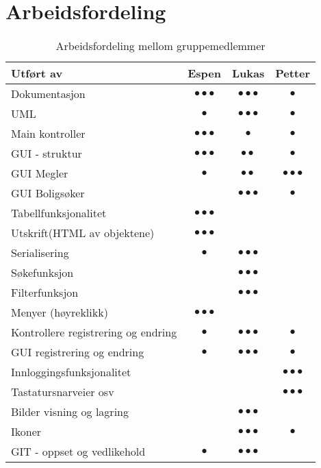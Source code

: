 \newpage
\section{Arbeidsfordeling}

\begin{table}[ht!]
\center
\caption{Arbeidsfordeling mellom gruppemedlemmer}
\label{tab:arbeidsfordeling}
\begin{tabular}{|p{6.8cm}|c|c|c|}

\hline
\textbf{Utført av}							&\textbf{Espen}				&\textbf{Lukas}				&\textbf{Petter}\\ \hline
Dokumentasjon								&$\bullet\bullet\bullet$	&$\bullet\bullet\bullet$	&$\bullet$\\	\hline
UML											&$\bullet$					&$\bullet\bullet\bullet$	&$\bullet$\\ \hline
Main kontroller								&$\bullet\bullet\bullet$	&$\bullet$					&$\bullet$\\ \hline
GUI - struktur								&$\bullet\bullet\bullet$	&$\bullet\bullet$			&$\bullet$\\ \hline
GUI Megler									&$\bullet$					&$\bullet\bullet$			&$\bullet\bullet\bullet$\\ \hline
GUI Boligsøker								&							&$\bullet\bullet\bullet$	&$\bullet$\\ \hline
Tabellfunksjonalitet						&$\bullet\bullet\bullet$	&							&\\ \hline
Utskrift(HTML av objektene)				&$\bullet\bullet\bullet$	&							&\\ \hline
Serialisering								&$\bullet$					&$\bullet\bullet\bullet$	&\\ \hline
Søkefunksjon								&							&$\bullet\bullet\bullet$	&\\ \hline
Filterfunksjon								&							&$\bullet\bullet\bullet$	&\\ \hline
Menyer (høyreklikk)							&$\bullet\bullet\bullet$	&							&\\ \hline
Kontrollere registrering og endring		&$\bullet$					&$\bullet\bullet\bullet$ 	&$\bullet$\\ \hline
GUI registrering og endring				&$\bullet$					&$\bullet\bullet\bullet$ 	&$\bullet$\\ \hline
Innloggingsfunksjonalitet					&							&							&$\bullet\bullet\bullet$\\ \hline
Tastatursnarveier osv						&							&							&$\bullet\bullet\bullet$\\ \hline
Bilder visning og lagring					&							&$\bullet\bullet\bullet$	&\\ \hline
Ikoner										&							&$\bullet\bullet\bullet$	&$\bullet$\\ \hline
GIT - oppset og vedlikehold				&$\bullet$					&$\bullet\bullet\bullet$	&\\ \hline

\end{tabular}
\end{table}